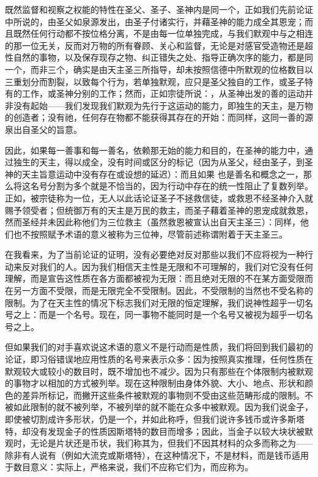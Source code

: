 既然监督和视察之权能的特性在圣父、圣子、圣神内是同一个，正如我们先前论证中所说的，由圣父如泉源发出，由圣子付诸实行，并藉圣神的能力成全其恩宠；而且既然任何行动都不按位格分离，不是由每一位单独完成，与我们默观中与之相连的那一位无关，反而对万物的所有眷顾、关心和监督，无论是对感官受造物还是超性自然的事物，以及保存现存之物、纠正错失之处、指导正确次序的能力，都是同一个，而非三个，确实是由天主圣三所指导，却未按照信德中所默观的位格数目以三重划分而割裂，以致每个行为，若单独默观，应只是圣父独自的工作，或圣子特有的工作，或圣神分别的工作；然而，正如宗徒所说：，从圣神出发的善的运动并非没有起始——我们发现我们默观为先行于这运动的能力，即独生的天主，是万物的创造者；没有祂，任何存在物都不能获得其存在的开始：而同样，这同一善的源泉出自圣父的旨意。\par

因此，如果每一善事和每一善名，依赖那无始的能力和目的，在圣神的能力中，通过独生的天主，得以成全，没有时间或区分的标记（因为从圣父，经由圣子，到圣神的天主旨意运动中没有存在或设想的延迟）：而且如果  也是善名和概念之一，那么将这名号分割为多个就是不恰当的，因为行动中存在的统一性阻止了复数列举。正如，被宗徒称为一位，无人以此话论证圣子不拯救信徒，或救恩不经圣神介入就赐予领受者；但统御万有的天主是万民的救主，而圣子藉着圣神的恩宠成就救恩，然而圣经并未因此称他们为三位救主（虽然救恩被宣认出自天主圣三）：同样，他们也不按照赋予术语的意义被称为三位神，尽管前述称谓附着于天主圣三。\par

在我看来，为了当前论证的证明，没有必要绝对反对那些以我们不应将视为一种行动来反对我们的人。因为我们相信天主性是无限和不可理解的，我们对它没有任何理解，而是宣告这性质在各方面都被视为无限：而且绝对无限的不在某方面受限而在另一方面不受限，而是无限完全不受限制。因此，不受限制的当然也不受名称的限制。为了在天主性的情况下标志我们对无限的恒定理解，我们说神性超乎一切名号之上：而是一个名号。现在，同一事物不能同时是一个名号又被视为超乎一切名号之上。\par

但如果我们的对手喜欢说这术语的意义不是行动而是性质，我们将回到我们最初的论证，即习俗错误地应用性质的名号来表示众多：因为按照真实推理，任何性质在默观较大或较小的数目时，既不增加也不减少。因为只有那些在个体限制内被默观的事物才以相加的方式被列举。现在这种限制由身体外貌、大小、地点、形状和颜色的差异所标记，而撇开这些条件被默观的事物则不受由这些范畴形成的限制。不被如此限制的就不被列举，不被列举的就不能在众多中被默观。因为我们说金子，即使被切割成许多形状，仍是一个，并如此称呼，但我们说许多钱币或许多斯塔特，却没有发现金子的性质因斯塔特的数目而增多；因此，当金子以较大块状被默观时，无论是片状还是币状，我们称其为，但我们不因其材料的众多而称之为——除非有人说有（例如大流克或斯塔特），在这种情况下，不是材料，而是钱币适用于数目意义：实际上，严格来说，我们不应称它们为，而应称为。\par

